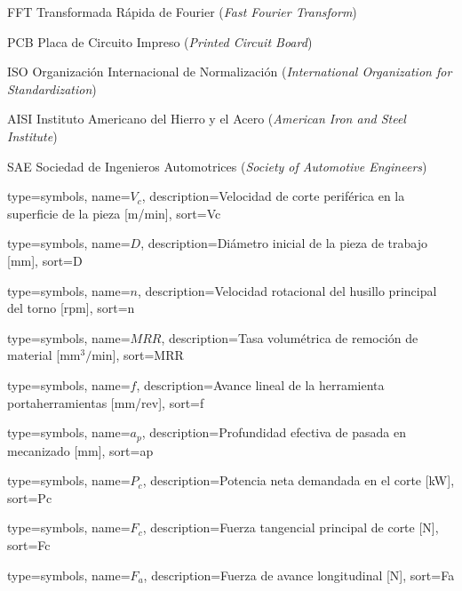             {FFT}
            {Transformada Rápida de Fourier (\textit{Fast Fourier Transform})}

            {PCB}
            {Placa de Circuito Impreso (\textit{Printed Circuit Board})}

            {ISO}
            {Organización Internacional de Normalización (\textit{International Organization for Standardization})}

            {AISI}
            {Instituto Americano del Hierro y el Acero (\textit{American Iron and Steel Institute})}

            {SAE}
            {Sociedad de Ingenieros Automotrices (\textit{Society of Automotive Engineers})}

%
%

{
    type=symbols,
    name={\ensuremath{V_c}},
    description={Velocidad de corte periférica en la superficie de la pieza [m/min]},
    sort=Vc
}

{
    type=symbols,
    name={\ensuremath{D}},
    description={Diámetro inicial de la pieza de trabajo [mm]},
    sort=D
}

{
    type=symbols,
    name={\ensuremath{n}},
    description={Velocidad rotacional del husillo principal del torno [rpm]},
    sort=n
}

{
    type=symbols,
    name={\ensuremath{MRR}},
    description={Tasa volumétrica de remoción de material [$\text{mm}^3/\text{min}$]},
    sort=MRR
}

{
    type=symbols,
    name={\ensuremath{f}},
    description={Avance lineal de la herramienta portaherramientas [mm/rev]},
    sort=f
}

{
    type=symbols,
    name={\ensuremath{a_p}},
    description={Profundidad efectiva de pasada en mecanizado [mm]},
    sort=ap
}

{
    type=symbols,
    name={\ensuremath{P_c}},
    description={Potencia neta demandada en el corte [kW]},
    sort=Pc
}

{
    type=symbols,
    name={\ensuremath{F_c}},
    description={Fuerza tangencial principal de corte [N]},
    sort=Fc
}

{
    type=symbols,
    name={\ensuremath{F_a}},
    description={Fuerza de avance longitudinal [N]},
    sort=Fa
}

